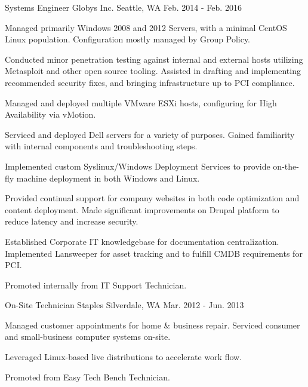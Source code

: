\begin{cventries}
\cventry
{Systems Engineer} %
{Globys Inc.} %
{Seattle, WA} %
{Feb. 2014 - Feb. 2016} %
{ %
\begin{cvitems}
\item {Managed primarily Windows 2008 and 2012 Servers, with a minimal CentOS Linux population. Configuration mostly managed by Group Policy.}
\item {Conducted minor penetration testing against internal and external hosts utilizing Metasploit and other open source tooling. Assisted in drafting and implementing recommended security fixes, and bringing infrastructure up to PCI compliance.}
\item {Managed and deployed multiple VMware ESXi hosts, configuring for High Availability via vMotion.}
\item {Serviced and deployed Dell servers for a variety of purposes. Gained familiarity with internal components and troubleshooting steps.}
\item {Implemented custom Syslinux/Windows Deployment Services to provide on-the-fly machine deployment in both Windows and Linux.}
\item {Provided continual support for company websites in both code optimization and content deployment. Made significant improvements on Drupal platform to reduce latency and increase security.}
\item {Established Corporate IT knowledgebase for documentation centralization. Implemented Lansweeper for asset tracking and to fulfill CMDB requirements for PCI.}
\item {Promoted internally from IT Support Technician.}
\end{cvitems}
}


\cventry
{On-Site Technician} %
{Staples} %
{Silverdale, WA} %
{Mar. 2012 - Jun. 2013} %
{ %
\begin{cvitems}
\item {Managed customer appointments for home \& business repair. Serviced consumer and small-business computer systems on-site.}
\item {Leveraged Linux-based live distributions to accelerate work flow.}
\item {Promoted from Easy Tech Bench Technician.}
\end{cvitems}
}



\end{cventries}
